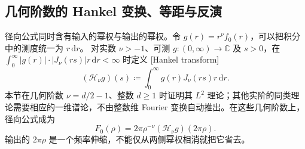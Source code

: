 \subsection{几何阶数的 Hankel 变换、等距与反演}
\label{b2:subsec:A20203}

径向公式同时含有输入的幂权与输出的幂权。令
\(g(r)=r^\nu f_0(r)\)，可以把积分中的测度统一为 \(r\,\mathrm dr\)。
对实数 \(\nu>-1\)、可测 \(g:(0,\infty)\to\mathbb C\) 及 \(s>0\)，在
\(\int_0^\infty|g(r)|\cdot|J_\nu(rs)|r\,\mathrm dr<\infty\) 时定义
[Hankel transform]
\[
 (\mathcal H_\nu g)(s)
 \coloneqq\int_0^\infty g(r)J_\nu(rs)r\,\mathrm dr.
\]
本节在几何阶数 \(\nu=d/2-1\)、整数 \(d\ge1\) 时证明其
\(L^2\) 理论；其他实阶的同类理论需要相应的一维谱论，不由整数维 Fourier 变换自动推出。在这些几何阶数上，径向公式成为
\[
 F_0(\rho)=2\pi\rho^{-\nu}(\mathcal H_\nu g)(2\pi\rho).
\]
输出的 \(2\pi\rho\) 是一个频率伸缩，不能仅从两侧幂权相消就把它省去。

